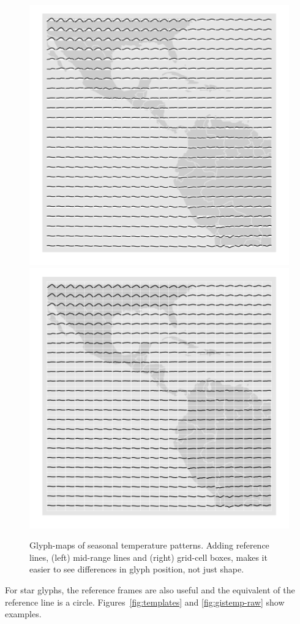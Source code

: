 \documentclass[oneside]{article}
\begin{document}
\begin{figure}[htbp]
  \centering
  \includegraphics[width=0.5\linewidth]{ref-line}%
  \includegraphics[width=0.5\linewidth]{ref-box}

  \caption{Glyph-maps of seasonal temperature patterns. Adding reference lines, (left) mid-range lines and (right) grid-cell boxes, makes it easier to see differences in glyph position, not just shape.}
  \label{fig:ref-basic}
\end{figure}

For star glyphs, the reference frames are also useful and the equivalent of the reference line is a circle. Figures~\ref{fig:templates} and \ref{fig:gistemp-raw} show examples.


\end{document}
